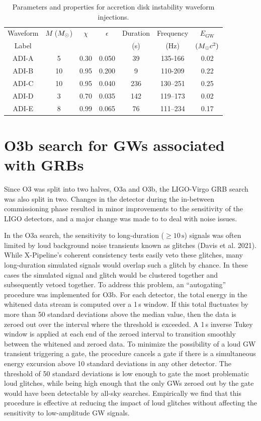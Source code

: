 \begin{table}[h!]
	\centering
	\caption
  {Parameters and properties for accretion disk instability waveform injections.
  \label{tab:adi}}
	\begin{tabular}{c c c c c c c}
		\hline
		Waveform & $M$ ($M_{\odot}$) & $\chi$ & $\epsilon$ & Duration & Frequency & $E_{\text{GW}}$ \\
		Label &  &  &  & (s) & (Hz) & $(M_{\odot} c^2)$ \\
		\hline
  	\hline
    ADI-A & 5 & 0.30 & 0.050 & 39 & 135-166 & 0.02 \\
    ADI-B & 10 & 0.95 & 0.200 & 9 & 110-209 & 0.22 \\
    ADI-C & 10 & 0.95 & 0.040 & 236 & 130–251 & 0.25 \\
    ADI-D & 3 & 0.70 & 0.035 & 142 & 119–173 & 0.02 \\
    ADI-E & 8 & 0.99 & 0.065 & 76 & 111–234 & 0.17 \\
		\hline
	\end{tabular}
\end{table}

\section{O3b search for GWs associated with GRBs}\label{sec:grb-o3b}

Since \ac{O3} was split into two halves, O3a and O3b, the \ac{LIGO}-Virgo \ac{GRB} search was also split in two.
Changes in the detector during the in-between commissioning phase resulted in minor improvements to the sensitivity of the LIGO detectors, and a major change was made to \xpip to deal with noise issues.

In the O3a search, the sensitivity to long-duration ($\geq 10\,\text{s}$) signals was often limited by loud background noise transients known as glitches (Davis et al. 2021).
While X-Pipeline's coherent consistency tests easily veto these glitches, many long-duration simulated signals would overlap such a glitch by chance.
In these cases the simulated signal and glitch would be clustered together and subsequently vetoed together.
To address this problem, an ``autogating'' procedure was implemented for O3b. For each detector, the total energy in the whitened data stream is computed over a 1\,s window.
If this total fluctuates by more than 50 standard deviations above the median value, then the data is zeroed out over the interval where the threshold is exceeded.
A 1\,s inverse Tukey window is applied at each end of the zeroed interval to transition smoothly between the whitened and zeroed data.
To minimize the possibility of a loud GW transient triggering a gate, the procedure cancels a gate if there is a simultaneous energy excursion above 10 standard deviations in any other detector.
The threshold of 50 standard deviations is low enough to gate the most problematic loud glitches, while being high enough that the only GWs zeroed out by the gate would have been detectable by all-sky searches.
Empirically we find that this procedure is effective at reducing the impact of loud glitches without affecting the sensitivity to low-amplitude GW signals.

